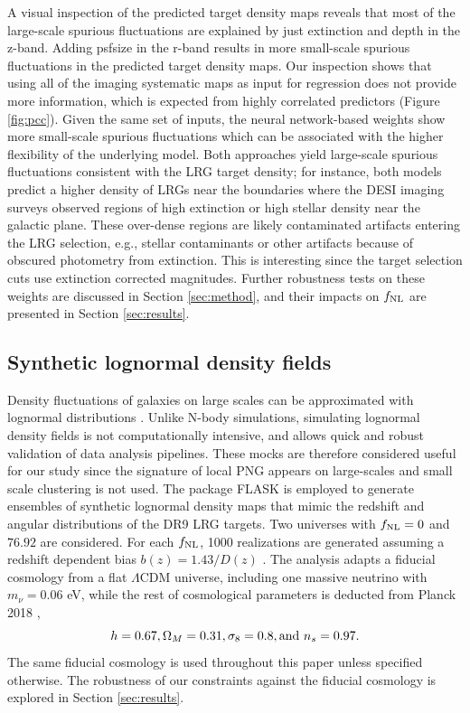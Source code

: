 A visual inspection of the predicted target density maps reveals that most of the large-scale spurious fluctuations are explained by just extinction and depth in the z-band. Adding psfsize in the r-band results in more small-scale spurious fluctuations in the predicted target density maps. Our inspection shows that using all of the imaging systematic maps as input for regression does not provide more information, which is expected from highly correlated predictors (Figure \ref{fig:pcc}). Given the same set of inputs, the neural network-based weights show more small-scale spurious fluctuations which can be associated with the higher flexibility of the underlying model. Both approaches yield large-scale spurious fluctuations consistent with the LRG target density; for instance, both models predict a higher density of LRGs near the boundaries where the DESI imaging surveys observed regions of high extinction or high stellar density near the galactic plane. These over-dense regions are likely contaminated artifacts entering the LRG selection, e.g., stellar contaminants or other artifacts because of obscured photometry from extinction. This is interesting since the target selection cuts use extinction corrected magnitudes. Further robustness tests on these weights are discussed in Section \ref{sec:method}, and their impacts on $f_{\rm NL}$ are presented in Section \ref{sec:results}.


\subsection{Synthetic lognormal density fields}\label{ssec:mocks}
Density fluctuations of galaxies on large scales can be approximated with lognormal distributions \citep{coles1991}. Unlike N-body simulations, simulating lognormal density fields is not computationally intensive, and allows quick and robust validation of data analysis pipelines. These mocks are therefore considered useful for our study since the signature of local PNG appears on large-scales and small scale clustering is not used. The package \textsc{FLASK} \citep[Full-sky Lognormal Astro-fields Simulation Kit;][]{Xavier_2016} is employed to generate ensembles of synthetic lognormal density maps that mimic the redshift and angular distributions of the DR9 LRG targets. Two universes with $f_{\rm NL}=0$ and $76.92$ are considered. For each $f_{\rm NL}$, 1000 realizations are generated assuming a redshift dependent bias $b(z)=1.43/D(z)$ \citep[see, e.g.,][]{zhou2021clustering}. The analysis adapts a fiducial cosmology from a flat $\Lambda$CDM universe, including one massive neutrino with $m_{\nu}=0.06$ eV, while the rest of cosmological parameters is deducted from Planck 2018 \citep{aghanim2020planck},
\begin{equation*}
 h = 0.67, \Omega_{M}=0.31, \sigma_{8}=0.8, {\rm and}~ n_{s}=0.97.
\end{equation*}
The same fiducial cosmology is used throughout this paper unless specified otherwise. The robustness of our constraints against the fiducial cosmology is explored in Section \ref{sec:results}.

